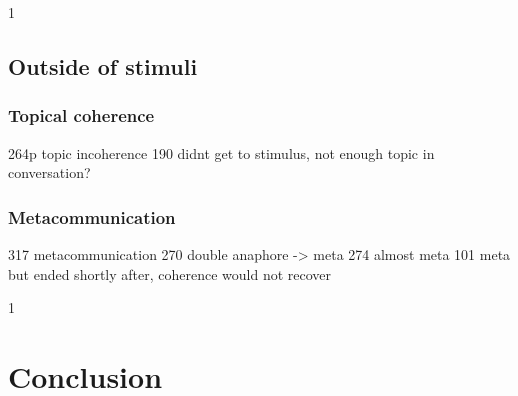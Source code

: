 1
\subsection{Outside of stimuli}

\subsubsection{Topical coherence}
    264p topic incoherence
    190 didnt get to stimulus, not enough topic in conversation?

\subsubsection{Metacommunication}
    317 metacommunication
    270 double anaphore -> meta
    274 almost meta
    101 meta but ended shortly after, coherence would not recover

1
\section{Conclusion}
